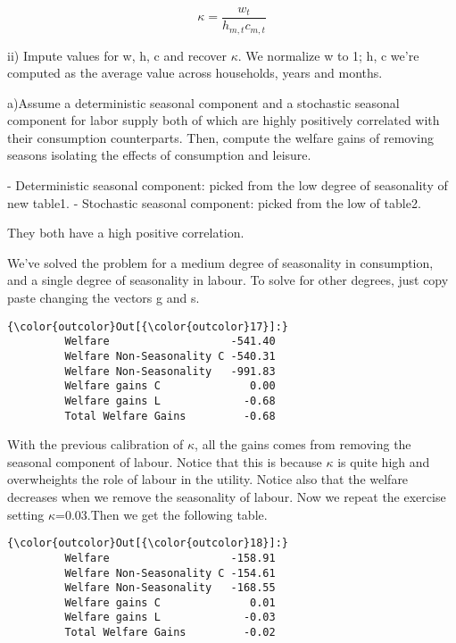 \documentclass[11pt]{article}
\begin{document}
$$\kappa=\frac{w_t}{h_{m,t}c_{m,t}}$$


ii) Impute values for w, h, c and recover $\kappa$. We normalize w to 1; h, c we're computed as the average value across households, years and months. 


a)Assume a deterministic seasonal component and a stochastic seasonal component for labor supply both of which are highly positively correlated with their consumption counterparts. Then, compute the welfare gains of removing seasons isolating the effects of consumption and leisure. 


- Deterministic seasonal component: picked from the low degree of seasonality of new table1. 
- Stochastic seasonal component: picked from the low of table2. 

They both have a high positive correlation. 



We've solved the problem for a medium degree of seasonality in consumption, and a single degree of seasonality in labour. To solve for other degrees, just copy paste changing the vectors g and s.


\begin{Verbatim}[commandchars=\\\{\}]
{\color{outcolor}Out[{\color{outcolor}17}]:}                                  
         Welfare                   -541.40
         Welfare Non-Seasonality C -540.31
         Welfare Non-Seasonality   -991.83
         Welfare gains C              0.00
         Welfare gains L             -0.68
         Total Welfare Gains         -0.68
\end{Verbatim}
            
    With the previous calibration of \(\kappa\), all the gains comes from removing the seasonal component of labour. Notice that this is because \(\kappa\) is quite high and overwheights the role of labour in the utility. Notice also that the welfare decreases when we remove the seasonality of labour. Now we repeat the exercise setting \(\kappa\)=0.03.Then we get the following table.

\begin{Verbatim}[commandchars=\\\{\}]
{\color{outcolor}Out[{\color{outcolor}18}]:}                                  
         Welfare                   -158.91
         Welfare Non-Seasonality C -154.61
         Welfare Non-Seasonality   -168.55
         Welfare gains C              0.01
         Welfare gains L             -0.03
         Total Welfare Gains         -0.02
\end{Verbatim}
            
\end{document}
